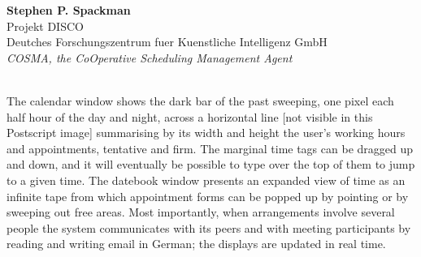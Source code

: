 \newpage{}


\begin{center}
\end{center}
\begin{tabular}
{\bf Stephen P. Spackman}\\
Projekt DISCO\\
Deutches Forschungszentrum fuer Kuenstliche Intelligenz GmbH\\
{\it COSMA, the CoOperative Scheduling Management Agent}\\
\\
\end{tabular}
The calendar window shows the dark bar of the past sweeping, one pixel
each half hour of the day and night, across a horizontal line [not
visible in this Postscript image] summarising by its width and height
the user's working hours and appointments, tentative and firm.  The
marginal time tags can be dragged up and down, and it will eventually be
possible to type over the top of them to jump to a given time.  The
datebook window presents an expanded view of time as an infinite tape
from which appointment forms can be popped up by pointing or by sweeping
out free areas.  Most importantly, when arrangements involve several
people the system communicates with its peers and with meeting
participants by reading and writing email in German; the displays are
updated in real time.

